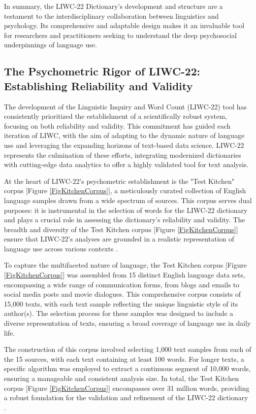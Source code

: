 In summary, the LIWC-22 Dictionary's development and structure are a testament to the interdisciplinary collaboration between linguistics and psychology. Its comprehensive and adaptable design makes it an invaluable tool for researchers and practitioners seeking to understand the deep psychosocial underpinnings of language use.

\subsection{The Psychometric Rigor of LIWC-22: Establishing Reliability and Validity}

\quad The development of the Linguistic Inquiry and Word Count (LIWC-22) tool has consistently prioritized the establishment of a scientifically robust system, focusing on both reliability and validity. This commitment has guided each iteration of LIWC, with the aim of adapting to the dynamic nature of language use and leveraging the expanding horizons of text-based data science. LIWC-22 represents the culmination of these efforts, integrating modernized dictionaries with cutting-edge data analytics to offer a highly validated tool for text analysis.

At the heart of LIWC-22's psychometric establishment is the "Test Kitchen" corpus [Figure \ref{FigKitchenCorpus}], a meticulously curated collection of English language samples drawn from a wide spectrum of sources. This corpus serves dual purposes: it is instrumental in the selection of words for the LIWC-22 dictionary and plays a crucial role in assessing the dictionary's reliability and validity. The breadth and diversity of the Test Kitchen corpus [Figure \ref{FigKitchenCorpus}] ensure that LIWC-22's analyses are grounded in a realistic representation of language use across various contexts \cite{boyd2022development}.

To capture the multifaceted nature of language, the Test Kitchen corpus [Figure \ref{FigKitchenCorpus}] was assembled from 15 distinct English language data sets, encompassing a wide range of communication forms, from blogs and emails to social media posts and movie dialogues. This comprehensive corpus consists of 15,000 texts, with each text sample reflecting the unique linguistic style of its author(s). The selection process for these samples was designed to include a diverse representation of texts, ensuring a broad coverage of language use in daily life.

The construction of this corpus involved selecting 1,000 text samples from each of the 15 sources, with each text containing at least 100 words. For longer texts, a specific algorithm was employed to extract a continuous segment of 10,000 words, ensuring a manageable and consistent analysis size. In total, the Test Kitchen corpus [Figure \ref{FigKitchenCorpus}] encompasses over 31 million words, providing a robust foundation for the validation and refinement of the LIWC-22 dictionary \cite{boyd2022development}.

